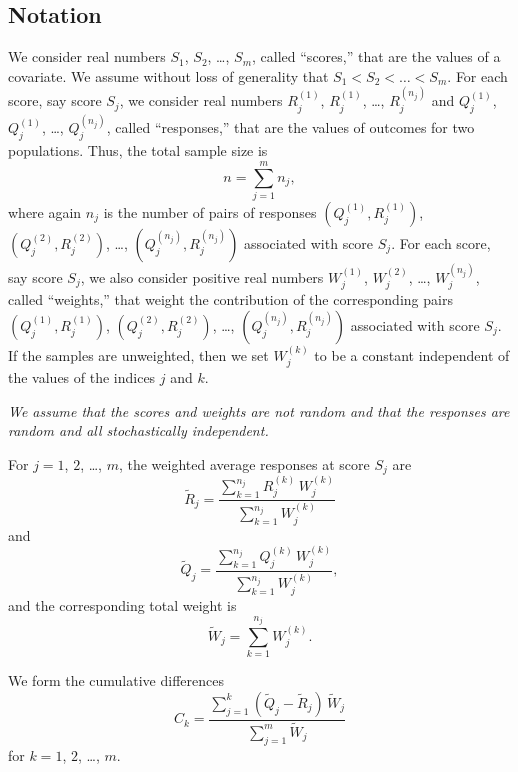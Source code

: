 \documentclass{article}
\begin{document}
\subsection{Notation}
\label{notation}

We consider real numbers $S_1$, $S_2$, \dots, $S_m$,
called ``scores,'' that are the values of a covariate.
We assume without loss of generality that $S_1 < S_2 < \dots < S_m$.
For each score, say score $S_j$, we consider real numbers
$R_j^{(1)}$, $R_j^{(1)}$, \dots, $R_j^{(n_j)}$ and
$Q_j^{(1)}$, $Q_j^{(1)}$, \dots, $Q_j^{(n_j)}$,
called ``responses,'' that are the values of outcomes for two populations.
Thus, the total sample size is
%
\begin{equation}
n = \sum_{j=1}^m n_j,
\end{equation}
%
where again $n_j$ is the number of pairs of responses
$(Q_j^{(1)}, R_j^{(1)})$, $(Q_j^{(2)}, R_j^{(2)})$, \dots,
$(Q_j^{(n_j)}, R_j^{(n_j)})$ associated with score $S_j$.
For each score, say score $S_j$, we also consider positive real numbers
$W_j^{(1)}$, $W_j^{(2)}$, \dots, $W_j^{(n_j)}$, called ``weights,''
that weight the contribution of the corresponding pairs
$(Q_j^{(1)}, R_j^{(1)})$, $(Q_j^{(2)}, R_j^{(2)})$, \dots,
$(Q_j^{(n_j)}, R_j^{(n_j)})$ associated with score $S_j$.
If the samples are unweighted, then we set $W_j^{(k)}$ to be a constant
independent of the values of the indices $j$ and $k$.

{\it We assume that the scores and weights are not random
and that the responses are random and all stochastically independent.}

For $j = 1$, $2$, \dots, $m$, the weighted average responses at score $S_j$ are
%
\begin{equation}
\tilde{R}_j = \frac{\sum_{k=1}^{n_j} R_j^{(k)} \, W_j^{(k)}}
                   {\sum_{k=1}^{n_j} W_j^{(k)}}
\end{equation}
%
and
%
\begin{equation}
\tilde{Q}_j = \frac{\sum_{k=1}^{n_j} Q_j^{(k)} \, W_j^{(k)}}
                   {\sum_{k=1}^{n_j} W_j^{(k)}},
\end{equation}
%
and the corresponding total weight is
%
\begin{equation}
\tilde{W}_j = \sum_{k=1}^{n_j} W_j^{(k)}.
\end{equation}

We form the cumulative differences
%
\begin{equation}
\label{cumdiff}
C_k = \frac{\sum_{j=1}^k (\tilde{Q}_j - \tilde{R}_j) \, \tilde{W}_j}
           {\sum_{j=1}^m \tilde{W}_j}
\end{equation}
%
for $k = 1$, $2$, \dots, $m$.
\end{document}
